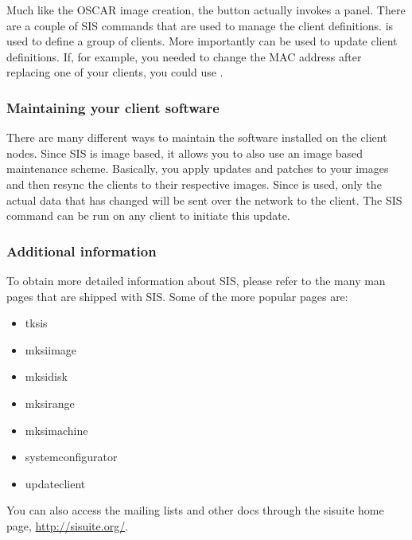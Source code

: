 Much like the OSCAR image creation, the  button actually
invokes a  panel. There are a couple of SIS commands that are used 
to manage the client definitions.  is used to define a group of
clients. More importantly  can be used to update client 
definitions. If, for example, you needed to change the MAC address after replacing
one of your clients, you could use .

\subsubsection{Maintaining your client software}

There are many different ways to maintain the software installed on the client
nodes. Since SIS is image based, it allows you to also use an image based 
maintenance scheme. Basically, you apply updates and patches to your images 
and then resync the clients to their respective images. Since  is
used, only the actual data that has changed will be sent over the network to 
the client. The SIS command  can be run on any client to
initiate this update.

\subsubsection{Additional information}

To obtain more detailed information about SIS, please refer to the many man
pages that are shipped with SIS. Some of the more popular pages are:

\begin{itemize}
\item tksis
\item mksiimage
\item mksidisk
\item mksirange
\item mksimachine
\item systemconfigurator
\item updateclient
\end{itemize}

You can also access the mailing lists and other docs through the sisuite
home page, \url{http://sisuite.org/}.
